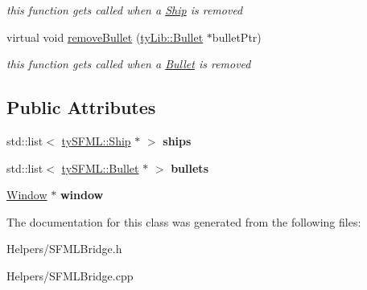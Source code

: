 \begin{DoxyCompactItemize}
\begin{DoxyCompactList}\small\item\em this function get\textquotesingle{}s called when a \hyperlink{classty_s_f_m_l_1_1_ship}{Ship} is removed \end{DoxyCompactList}\item 
\hypertarget{classty_s_f_m_l_1_1_s_f_m_l_bridge_a4657c5dbd2163a9fd880311c63e5c17a}{}virtual void \hyperlink{classty_s_f_m_l_1_1_s_f_m_l_bridge_a4657c5dbd2163a9fd880311c63e5c17a}{remove\+Bullet} (\hyperlink{classty_lib_1_1_bullet}{ty\+Lib\+::\+Bullet} $\ast$bullet\+Ptr)\label{classty_s_f_m_l_1_1_s_f_m_l_bridge_a4657c5dbd2163a9fd880311c63e5c17a}

\begin{DoxyCompactList}\small\item\em this function get\textquotesingle{}s called when a \hyperlink{classty_s_f_m_l_1_1_bullet}{Bullet} is removed \end{DoxyCompactList}\end{DoxyCompactItemize}
\subsection*{Public Attributes}
\begin{DoxyCompactItemize}
\item 
\hypertarget{classty_s_f_m_l_1_1_s_f_m_l_bridge_a691e8481e118cc3892a61cdb66420352}{}std\+::list$<$ \hyperlink{classty_s_f_m_l_1_1_ship}{ty\+S\+F\+M\+L\+::\+Ship} $\ast$ $>$ {\bfseries ships}\label{classty_s_f_m_l_1_1_s_f_m_l_bridge_a691e8481e118cc3892a61cdb66420352}

\item 
\hypertarget{classty_s_f_m_l_1_1_s_f_m_l_bridge_afdc164e3e7c8735ea131ede215a8f1fa}{}std\+::list$<$ \hyperlink{classty_s_f_m_l_1_1_bullet}{ty\+S\+F\+M\+L\+::\+Bullet} $\ast$ $>$ {\bfseries bullets}\label{classty_s_f_m_l_1_1_s_f_m_l_bridge_afdc164e3e7c8735ea131ede215a8f1fa}

\item 
\hypertarget{classty_s_f_m_l_1_1_s_f_m_l_bridge_a9d3269aa799d526decfb75459205e713}{}\hyperlink{classty_s_f_m_l_1_1_window}{Window} $\ast$ {\bfseries window}\label{classty_s_f_m_l_1_1_s_f_m_l_bridge_a9d3269aa799d526decfb75459205e713}

\end{DoxyCompactItemize}


The documentation for this class was generated from the following files\+:\begin{DoxyCompactItemize}
\item 
Helpers/S\+F\+M\+L\+Bridge.\+h\item 
Helpers/S\+F\+M\+L\+Bridge.\+cpp\end{DoxyCompactItemize}
